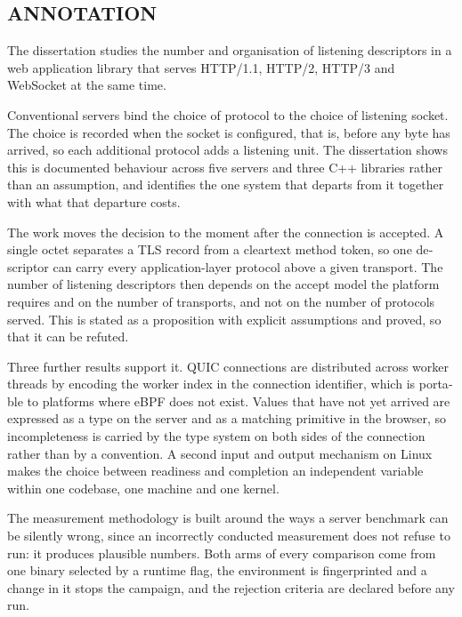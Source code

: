 \clearpage
\begin{otherlanguage}{english}
\begingroup
\renewcommand{\bgen}[2]{#2}

\section*{\bgen{АНОТАЦИЯ}{ANNOTATION}}

The dissertation studies the number and organisation of listening descriptors in a
web application library that serves HTTP/1.1, HTTP/2, HTTP/3 and WebSocket at the
same time.

Conventional servers bind the choice of protocol to the choice of listening socket.
The choice is recorded when the socket is configured, that is, before any byte has
arrived, so each additional protocol adds a listening unit. The dissertation shows
this is documented behaviour across five servers and three C++ libraries rather than
an assumption, and identifies the one system that departs from it together with what
that departure costs.

The work moves the decision to the moment after the connection is accepted. A single
octet separates a TLS record from a cleartext method token, so one descriptor can
carry every application-layer protocol above a given transport. The number of
listening descriptors then depends on the accept model the platform requires and on the
number of transports, and not on the number of protocols served. This is stated as a
proposition with explicit assumptions and proved, so that it can be refuted.

Three further results support it. QUIC connections are distributed across worker
threads by encoding the worker index in the connection identifier, which is portable
to platforms where eBPF does not exist. Values that have not yet arrived are
expressed as a type on the server and as a matching primitive in the browser, so
incompleteness is carried by the type system on both sides of the connection rather
than by a convention. A second input and output mechanism on Linux makes the choice
between readiness and completion an independent variable within one codebase, one
machine and one kernel.

The measurement methodology is built around the ways a server benchmark can be
silently wrong, since an incorrectly conducted measurement does not refuse to run: it
produces plausible numbers. Both arms of every comparison come from one binary
selected by a runtime flag, the environment is fingerprinted and a change in it stops
the campaign, and the rejection criteria are declared before any run.


\end{otherlanguage}
